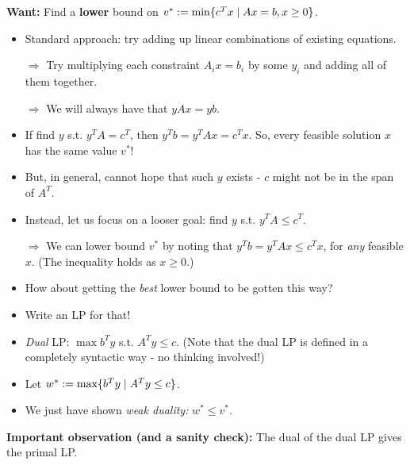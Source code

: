\documentclass{article}
\begin{document}
\textbf{Want:} Find a {\bf lower} bound on $v^*:=\min \{ c^Tx \mid Ax=b, x
  \ge 0 \}$.
\begin{itemize}
\item Standard approach: try adding up linear combinations of existing equations.

$\Rightarrow$ Try multiplying each constraint $A_i x = b_i$ by some $y_i$ and adding  all of them together.

$\Rightarrow$ We will always have that $yAx=yb$.
\item If find $y$ s.t. $y^TA=c^T$, then $y^Tb=y^TAx=c^Tx$. So, every feasible solution $x$ has the same value $v^*$!
\item But, in general, cannot hope that such $y$ exists - $c$ might not be in the span of $A^T$. 
\item Instead, let us focus on a looser goal:  find $y$ s.t. $y^TA \le c^T$. 

$\Rightarrow$ We can lower bound $v^*$ by noting that $y^T b= y^TAx \le c^Tx$, for {\em any} feasible $x$. (The inequality holds as $x\geq 0$.)

\item How about getting the {\em best} lower bound to be gotten this way?

\item Write an LP for that!

\item {\em Dual} LP: $\max b^Ty$ s.t. $A^Ty\leq c$. (Note that the dual LP is defined in a completely syntactic way - no thinking involved!)

\item Let $w^*:=\max \{ b^Ty \mid A^Ty \le c \}$.
\item We just have shown {\em weak duality:} $w^*\leq v^*$. 
\end{itemize}


{\bf Important observation (and a sanity check):} The dual of the dual LP gives the primal LP. 
\end{document}
